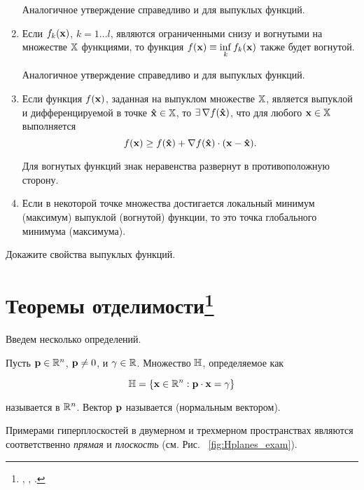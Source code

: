 \begin{enumerate}
Аналогичное утверждение справедливо и для выпуклых функций.

  \item Если $f_k (\mathbf{x})$, $k=1 \ldots l$, являются ограниченными снизу и
  вогнутыми  на множестве $\mathbb{X}$ функциями, то функция $f(\mathbf{x}) \equiv
  \mathop {\inf }\limits_k f_k(\mathbf{x})$ также будет вогнутой.

  Аналогичное утверждение справедливо и для выпуклых функций.

  \item Если функция $f(\mathbf{x})$, заданная на выпуклом множестве
  $\mathbb{X}$, является выпуклой и дифференцируемой в точке $\mathbf{\hat x} \in
  \mathbb{X}$, то $\exists \, \nabla f(\mathbf{\hat x})$, что для любого $\mathbf{x} \in
  \mathbb{X}$ выполняется
  \[
f(\mathbf{x}) \geq f(\mathbf{\hat x}) + \nabla f(\mathbf{\hat x}) \cdot
(\mathbf{x}-\mathbf{\hat x}).
  \]

  Для вогнутых функций знак неравенства развернут в противоположную сторону.

  \item Если в некоторой точке множества достигается локальный
  минимум (максимум) выпуклой (вогнутой) функции, то это точка
  глобального минимума (максимума).

\end{enumerate}

\begin{exer}
Докажите свойства выпуклых функций.
\end{exer}


\section{Теоремы отделимости\protect\footnote{\cite{Nikaido:1972}, \cite{Takayama:1985},
\cite{Braverman:1976}.}}

Введем несколько определений.

\begin{dfn}

Пусть $\mathbf{p} \in \mathbb{R}^n$, $\mathbf{p} \neq 0$, и $\gamma \in \mathbb{R}$.
Множество $\mathbb{H}$, определяемое как

\[
\mathbb{H}= \{ \mathbf{x}\in \mathbb{R}^n: \mathbf{p} \cdot \mathbf{x} = \gamma\}
\]

\noindent называется  в
$\mathbb{R}^n$. Вектор $\mathbf{p}$ называется  (нормальным
вектором). \end{dfn}

Примерами гиперплоскостей в двумерном и трехмерном пространствах
являются соответственно \emph{прямая} и \emph{плоскость} (см. Рис.
~\ref{fig:Hplanes_exam}).

